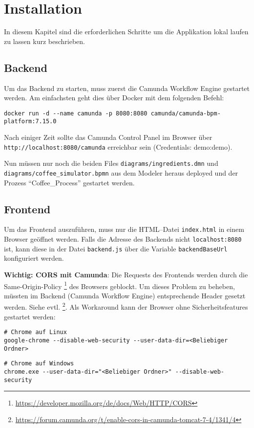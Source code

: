 \chapter{Installation}\label{ch:installation}
In diesem Kapitel sind die erforderlichen Schritte um die Applikation lokal laufen zu lassen kurz beschrieben.


\section{Backend}\label{sec:backend}
Um das Backend zu starten, muss zuerst die Camunda Workflow Engine gestartet werden.
Am einfachsten geht dies über Docker mit dem folgenden Befehl:

\begin{verbatim}
docker run -d --name camunda -p 8080:8080 camunda/camunda-bpm-platform:7.15.0
\end{verbatim}

Nach einiger Zeit sollte das Camunda Control Panel im Browser über \texttt{http://localhost:8080/camunda} erreichbar sein (Credentials: demo:demo).

Nun müssen nur noch die beiden Files \texttt{diagrams/ingredients.dmn} und \texttt{diagrams/coffee_simulator.bpmn} aus dem Modeler heraus deployed und der Prozess ``Coffee\_Process'' gestartet werden.


\section{Frontend}\label{sec:frontend}
Um das Frontend auszuführen, muss nur die HTML--Datei \texttt{index.html} in einem Browser geöffnet werden.
Falls die Adresse des Backends nicht \texttt{localhost:8080} ist, kann diese in der Datei \texttt{backend.js} über die Variable \texttt{backendBaseUrl} konfiguriert werden.

\textbf{Wichtig: CORS mit Camunda}:
Die Requests des Frontends werden durch die Same-Origin-Policy \footnote{\url{https://developer.mozilla.org/de/docs/Web/HTTP/CORS}} des Browsers geblockt.
Um dieses Problem zu beheben, müssten im Backend (Camunda Workflow Engine) entsprechende Header gesetzt werden.
Siehe evtl. \footnote{\url{https://forum.camunda.org/t/enable-cors-in-camunda-tomcat-7-4/1341/4}}.
Als Workaround kann der Browser ohne Sicherheitsfeatures gestartet werden:

\begin{verbatim}
# Chrome auf Linux
google-chrome --disable-web-security --user-data-dir=<Beliebiger Ordner>
\end{verbatim}

\begin{verbatim}
# Chrome auf Windows
chrome.exe --user-data-dir="<Beliebiger Ordner>" --disable-web-security
\end{verbatim}


